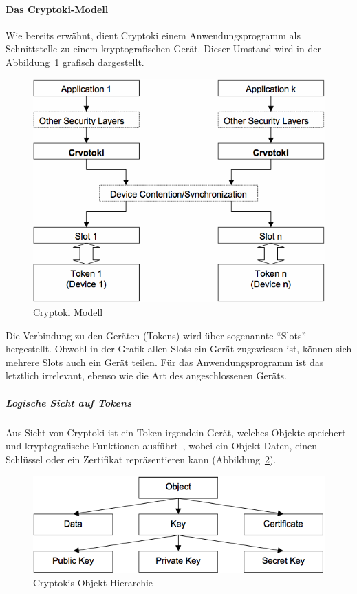 \documentclass[10pt,a4paper]{article}
\begin{document}
\paragraph{Das Cryptoki-Modell}
Wie bereits erwähnt, dient Cryptoki einem Anwendungsprogramm als Schnittstelle zu einem
kryptografischen Gerät. Dieser Umstand wird in der Abbildung~\ref{fig:cryptoki-model}
grafisch dargestellt.

\begin{figure}[ht]
    \centering
    \includegraphics[scale=0.56]{images/general_cryptoki_model.png}
    \caption{Cryptoki Modell~\cite[S.14]{pkcs11}}
    \label{fig:cryptoki-model}
\end{figure}

Die Verbindung zu den Geräten (Tokens) wird über sogenannte "`Slots"' hergestellt. Obwohl in
der Grafik allen Slots ein Gerät zugewiesen ist, können sich mehrere Slots auch ein Gerät
teilen. Für das Anwendungsprogramm ist das letztlich irrelevant, ebenso wie die Art des
angeschlossenen Geräts.

\subparagraph{Logische Sicht auf Tokens}
Aus Sicht von Cryptoki ist ein Token irgendein Gerät, welches Objekte speichert und
kryptografische Funktionen ausführt~\cite[S.15]{pkcs11}, wobei ein Objekt Daten, einen
Schlüssel oder ein Zertifikat repräsentieren kann
(Abbildung~\ref{fig:cryptoki-object-hierarchy}).

\begin{figure}[ht]
    \centering
    \includegraphics[scale=0.56]{images/cryptoki_object_hierarchy.png}
    \caption{Cryptokis Objekt-Hierarchie~\cite[S.15]{pkcs11}}
    \label{fig:cryptoki-object-hierarchy}
\end{figure}
\end{document}
